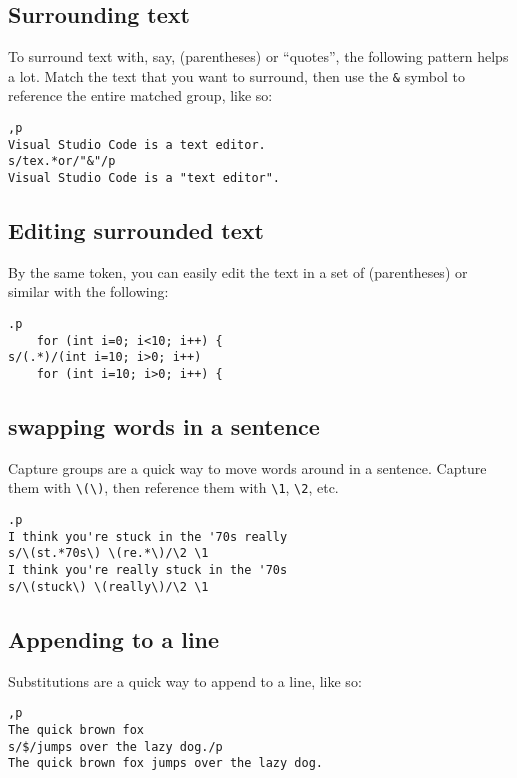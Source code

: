 \documentclass[12pt]{article}
\begin{document}
\subsection{Surrounding text}

To surround text with, say, (parentheses) or ``quotes'', the following pattern helps a lot.
Match the text that you want to surround, then use the \lstinline{&} symbol to reference
the entire matched group, like so:

\begin{lstlisting}
,p
Visual Studio Code is a text editor.
s/tex.*or/"&"/p
Visual Studio Code is a "text editor".
\end{lstlisting}

\subsection{Editing surrounded text}

By the same token, you can easily edit the text in a set of (parentheses) or similar with the following:

\begin{lstlisting}
.p
    for (int i=0; i<10; i++) {
s/(.*)/(int i=10; i>0; i++)
    for (int i=10; i>0; i++) {
\end{lstlisting}

\subsection{swapping words in a sentence}

Capture groups are a quick way to move words around in a sentence. Capture them with \lstinline{\(\)}, then
reference them with \lstinline{\1}, \lstinline{\2}, etc.

\begin{lstlisting}
.p
I think you're stuck in the '70s really
s/\(st.*70s\) \(re.*\)/\2 \1
I think you're really stuck in the '70s
s/\(stuck\) \(really\)/\2 \1
\end{lstlisting}

\subsection{Appending to a line}

Substitutions are a quick way to append to a line, like so:

\begin{lstlisting}
,p
The quick brown fox
s/$/jumps over the lazy dog./p
The quick brown fox jumps over the lazy dog.
\end{lstlisting}
\end{document}
